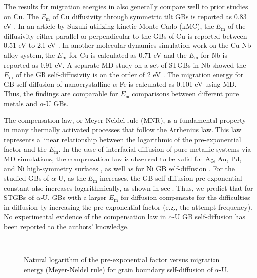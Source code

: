 \documentclass[review]{elsarticle}
\begin{document}
The results for migration energies in  also generally compare well to prior studies on Cu. The $E_{\mathrm{m}}$ of Cu diffusivity through symmetric tilt GBs is reported as 0.83 eV \cite{AginCu}.
In an article by Suzuki \cite{Suzuki2003} utilizing kinetic Monte Carlo (kMC), the $E_{\mathrm{m}}$ of the diffusivity either parallel or perpendicular to the GBs of Cu is reported between 0.51 eV to 2.1 eV \cite{Suzuki2003}. In another molecular dynamics simulation work on the Cu-Nb alloy system, the $E_{\mathrm{m}}$ for Cu is calculated as 0.71 eV and the $E_{\mathrm{m}}$ for Nb is reported as 0.91 eV\cite{cu_nb}. A separate MD study on a set of STGBs in Nb showed the $E_{\mathrm{m}}$ of the GB self-diffusivity is on the order of 2 eV \cite{Popov2022}. The migration energy for GB self-diffusion of nanocrystalline $\alpha$-Fe \cite{MOHAMMADZADEH201756} is calculated as 0.101 eV using MD. Thus, the findings are comparable for $E_{\mathrm{m}}$ comparisons between different pure metals and $\alpha$-U GBs.

The compensation law, or Meyer-Neldel rule (MNR), is a fundamental property in many thermally activated processes that follow the Arrhenius law. This law represents a linear relationship between the logarithmic of the pre-exponential factor and the $E_{\mathrm{m}}$. In the case of interfacial diffusion of pure metallic systems via MD simulations, the compensation law is observed to be valid for Ag, Au, Pd, and Ni high-symmetry surfaces \cite{compansation}, as well as for Ni GB self-diffusion \cite{Mendelev2005}. For the studied GBs of $\alpha$-U, as the $E_{\mathrm{m}}$ increases, the GB self-diffusion pre-exponential constant also increases logarithmically, as shown in see . Thus, we predict that for STGBs of $\alpha$-U, GBs with a larger $E_{\mathrm{m}}$ for diffusion compensate for the difficulties in diffusion by increasing the pre-exponential factor (e.g., the attempt frequency). No experimental evidence of the compensation law in $\alpha$-U GB self-diffusion has been reported to the authors' knowledge.

\begin{figure}[h!]
\centering
{}\\
\caption{Natural logarithm of the pre-exponential factor versus migration energy (Meyer-Neldel rule) for grain boundary self-diffusion of $\alpha$-U.}
\label{fig:compan}
\end{figure}
\end{document}
